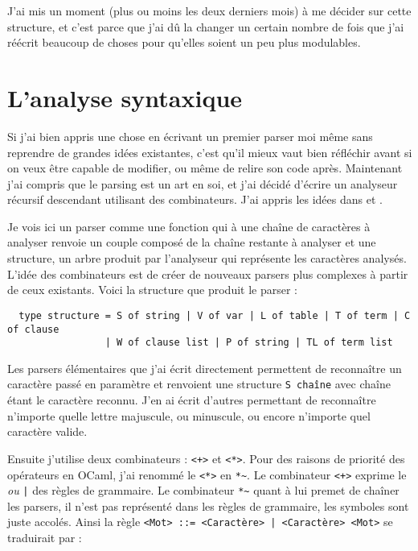 \documentclass{article}
\begin{document}
J'ai mis un moment (plus ou moins les deux derniers mois) à me décider sur cette structure, et c'est parce que j'ai dû la changer un certain nombre de fois que j'ai réécrit beaucoup de choses pour qu'elles soient un peu plus modulables.



\section{L'analyse syntaxique}

Si j'ai bien appris une chose en écrivant un premier parser moi même sans reprendre de grandes idées existantes, c'est qu'il mieux vaut bien réfléchir avant si on veux être capable de modifier, ou même de relire son code après. Maintenant j'ai compris que le parsing est un art en soi, et j'ai décidé d'écrire un analyseur récursif descendant utilisant des combinateurs. J'ai appris les idées dans \cite{Ljunglof} et \cite{KrishnaswamiYallop}.

Je vois ici un parser comme une fonction qui à une chaîne de caractères à analyser renvoie un couple composé de la chaîne restante à analyser et une structure, un arbre produit par l'analyseur qui représente les caractères analysés. L'idée des combinateurs est de créer de nouveaux parsers plus complexes à partir de ceux existants. Voici la structure que produit le parser :

\begin{verbatim}
  type structure = S of string | V of var | L of table | T of term | C of clause
                 | W of clause list | P of string | TL of term list
\end{verbatim}

Les parsers élémentaires que j'ai écrit directement permettent de reconnaître un caractère passé en paramètre et renvoient une structure \texttt{S chaîne} avec chaîne étant le caractère reconnu. J'en ai écrit d'autres permettant de reconnaître n'importe quelle lettre majuscule, ou minuscule, ou encore n'importe quel caractère valide.

Ensuite j'utilise deux combinateurs : \texttt{<+>} et \texttt{<*>}. Pour des raisons de priorité des opérateurs en OCaml, j'ai renommé le \texttt{<*>} en \texttt{*\textasciitilde*}. Le combinateur \texttt{<+>} exprime le \emph{ou} \texttt{|} des règles de grammaire. Le combinateur \texttt{*\textasciitilde*} quant à lui premet de chaîner les parsers, il n'est pas représenté dans les règles de grammaire, les symboles sont juste accolés. Ainsi la règle \texttt{<Mot> ::= <Caractère> | <Caractère> <Mot>} se traduirait par :
\end{document}
